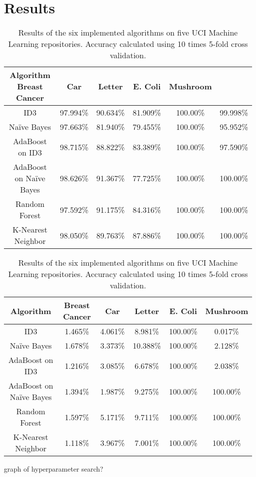 \documentclass[11pt]{article}
\begin{document}
\section{Results}
\begin{table}
  \begin{tabular}{ |c|c|c|c|c|c| }
    \hline
    Algorithm               Breast Cancer   & Car      & Letter   & E. Coli  & Mushroom \\ \hline
    ID3                     & 97.994\%      & 90.634\% & 81.909\% & 100.00\% & 99.998\% \\ \hline
    Naïve Bayes             & 97.663\%      & 81.940\% & 79.455\% & 100.00\% & 95.952\% \\ \hline
    AdaBoost on ID3         & 98.715\%      & 88.822\% & 83.389\% & 100.00\% & 97.590\% \\ \hline
    AdaBoost on Naïve Bayes & 98.626\%      & 91.367\% & 77.725\% & 100.00\% & 100.00\% \\ \hline
    Random Forest           & 97.592\%      & 91.175\% & 84.316\% & 100.00\% & 100.00\% \\ \hline
    K-Nearest Neighbor      & 98.050\%      & 89.763\% & 87.886\% & 100.00\% & 100.00\% \\ \hline
  \end{tabular}
  \caption{Results of the six implemented algorithms on five UCI Machine Learning repositories. Accuracy calculated using 10 times 5-fold cross validation.}
\end{table}

\begin{table}
  \begin{tabular}{ |c|c|c|c|c|c| }
    \hline
    Algorithm               & Breast Cancer & Car      & Letter   & E. Coli  & Mushroom \\ \hline
    ID3                     & 1.465\%       & 4.061\%  & 8.981\%  & 100.00\% & 0.017\% \\ \hline
    Naïve Bayes             & 1.678\%       & 3.373\%  & 10.388\% & 100.00\% & 2.128\% \\ \hline
    AdaBoost on ID3         & 1.216\%       & 3.085\%  & 6.678\%  & 100.00\% & 2.038\% \\ \hline
    AdaBoost on Naïve Bayes & 1.394\%       & 1.987\%  & 9.275\%  & 100.00\% & 100.00\% \\ \hline
    Random Forest           & 1.597\%       & 5.171\%  & 9.711\%  & 100.00\% & 100.00\% \\ \hline
    K-Nearest Neighbor      & 1.118\%       & 3.967\%  & 7.001\%  & 100.00\% & 100.00\% \\ \hline
  \end{tabular}
  \caption{Results of the six implemented algorithms on five UCI Machine Learning repositories. Accuracy calculated using 10 times 5-fold cross validation.}
\end{table}

graph of hyperparameter search?



\end{document}
